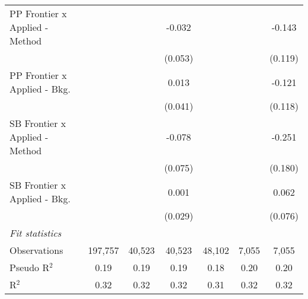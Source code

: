 \begin{tabular}{lcccccc}
   PP Frontier x Applied - Method &               &               & -0.032        &              &              & -0.143\\   
                                  &               &               & (0.053)       &              &              & (0.119)\\   
   PP Frontier x Applied - Bkg.   &               &               & 0.013         &              &              & -0.121\\   
                                  &               &               & (0.041)       &              &              & (0.118)\\   
   SB Frontier x Applied - Method &               &               & -0.078        &              &              & -0.251\\   
                                  &               &               & (0.075)       &              &              & (0.180)\\   
   SB Frontier x Applied - Bkg.   &               &               & 0.001         &              &              & 0.062\\   
                                  &               &               & (0.029)       &              &              & (0.076)\\   
   \midrule
   \emph{Fit statistics}\\
   Observations                   & 197,757       & 40,523        & 40,523        & 48,102       & 7,055        & 7,055\\  
   Pseudo R$^2$                   & 0.19          & 0.19          & 0.19          & 0.18         & 0.20         & 0.20\\  
   R$^2$                          & 0.32          & 0.32          & 0.32          & 0.31         & 0.32         & 0.32\\  
   

\end{tabular}
